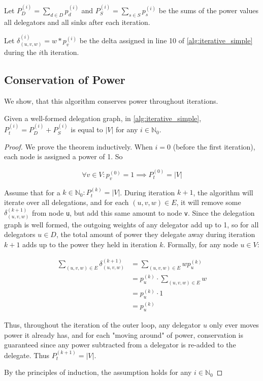 Let $P_D^{(i)} = \sum_{d \in D} p_d^{(i)}$ and $P_S^{(i)} = \sum_{s \in S} p_s^{(i)}$ be the sums of the power values all delegators and all sinks after each iteration.

Let $\delta_{(u, v, w)}^{(i)} = w * p_v^{(i)}$ be the delta assigned in line 10 of \cref{alg:iterative_simple} during the $i$th iteration.

\subsection{Conservation of Power}

We show, that this algorithm conserves power throughout iterations.

\begin{theorem}
\label{theo:iterative_cons_of_power}
Given a well-formed delegation graph, in \cref{alg:iterative_simple}, $P_t^{(i)} = P_D^{(i)} + P_S^{(i)}$ is equal to $|V|$ for any $i \in \mathbb{N}_0$.
\end{theorem}
\begin{proof}

We prove the theorem inductively. When $i = 0$ (before the first iteration), each node is assigned a power of 1. So 

\[
\forall v \in V: p_v^{(0)} = 1 \implies P_t^{(0)} = |V|
\]

Assume that for a $k \in \mathbb{N}_0: P_t^{(k)} = |V|$. During iteration $k+1$, the algorithm will iterate over all delegations, and for each $(u, v, w) \in E$, it will remove some $\delta_{(u, v, w)}^{(k+1)}$ from node \texttt{u}, but add this same amount to node \texttt{v}. Since the delegation graph is well formed, the outgoing weights of any delegator add up to 1, so for all delegators $u \in D$, the total amount of power they delegate away during iteration $k+1$ adds up to the power they held in iteration $k$. Formally, for any node $u \in V$:

\begin{align*}
\sum_{(u, v, w) \in E} \delta_{(u, v, w)}^{(k+1)} &=  \sum_{(u, v, w) \in E} wp_u^{(k)} \\
&= p_u^{(k)}  \cdot \sum_{(u, v, w) \in E} w \\
&= p_u^{(k)} \cdot 1 \\
&= p_u^{(k)}
\end{align*}

Thus, throughout the iteration of the outer loop, any delegator $u$ only ever moves power it already has, and for each "moving around" of power, conservation is guaranteed since any power subtracted from a delegator is re-added to the delegate. Thus $P_t^{(k+1)} = |V|$. 

By the principles of induction, the assumption holds for any $i \in \mathbb{N}_0$

\end{proof}

